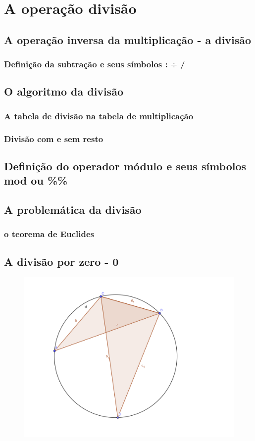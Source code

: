 \chapter[A operação divisão]{A operação divisão}

\section{A operação inversa da multiplicação - a divisão}

\subsection{Definição da subtração e seus símbolos : $ \div $ / }

\section{O algoritmo da divisão}

\subsection{A tabela de divisão na tabela de multiplicação}

\subsection{Divisão com e sem resto}

\section{Definição do operador módulo e seus símbolos \textbf{mod} ou \%\% }

\section{A problemática da divisão}

\subsection{o teorema de Euclides}

\section{A divisão por zero - 0}

\begin{figure}
	\centering
	\includegraphics[width=0.7\linewidth]{2-caps/cap01/screenshot001}
	\caption{}
	\label{fig:screenshot001}
\end{figure}

